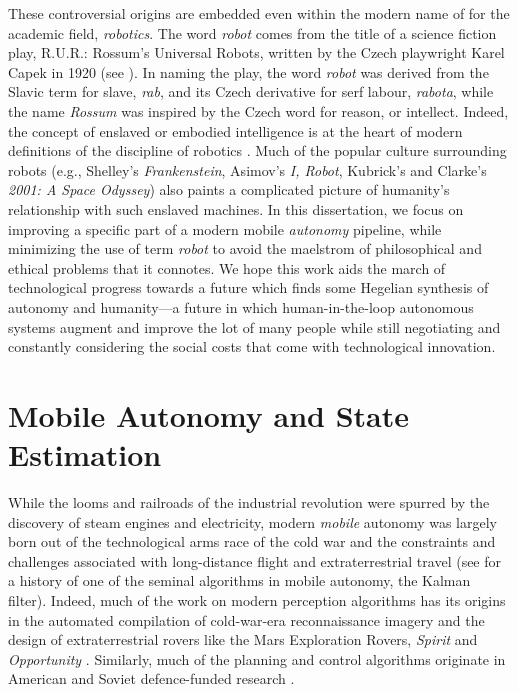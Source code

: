 These controversial origins are embedded even within the modern name of for the academic field, \textit{robotics}. The word \textit{robot} comes from the title of a science fiction play, R.U.R.: Rossum's Universal Robots, written by the Czech playwright Karel Capek in 1920 (see ). In naming the play, the word \textit{robot} was derived from the Slavic term for slave, \textit{rab}, and its Czech derivative for serf labour, \textit{rabota}, while the name \textit{Rossum} was inspired by the Czech word for reason, or intellect. Indeed, the concept of enslaved or embodied  intelligence is at the heart of modern definitions of the discipline of robotics \citep{Redfield2019-pi}. Much of the popular culture surrounding robots (e.g., Shelley's \textit{Frankenstein}, Asimov's \textit{I, Robot}, Kubrick's and Clarke's \textit{2001: A Space Odyssey}) also paints a complicated picture of humanity's relationship with such enslaved machines. In this dissertation, we focus on improving a specific part of a modern mobile \textit{autonomy} pipeline, while minimizing the use of term \textit{robot} to avoid the maelstrom of philosophical and ethical problems that it connotes. We hope this work aids the march of technological progress towards a future which finds some Hegelian synthesis of autonomy and humanity---a future in which human-in-the-loop autonomous systems augment and improve the lot of many people while still negotiating and constantly considering the social costs that come with technological innovation.

\section{Mobile Autonomy and State Estimation}
While the looms and railroads of the industrial revolution were spurred by the discovery of steam engines and electricity, modern \textit{mobile} autonomy was largely born out of the technological arms race of the cold war and the constraints and challenges associated with long-distance flight and extraterrestrial travel (see \cite{Grewal2010-ts} for a history of one of the seminal algorithms in mobile autonomy, the Kalman filter). Indeed, much of the work on modern perception algorithms has its origins in the automated compilation of cold-war-era reconnaissance imagery and the design of extraterrestrial rovers like the Mars Exploration Rovers, \textit{Spirit} and \textit{Opportunity} \citep{Scaramuzza2011-qr}. Similarly, much of the planning and control algorithms originate in American and Soviet defence-funded research \citep{Nilsson1984-oc,Thrun2006-hb}.

